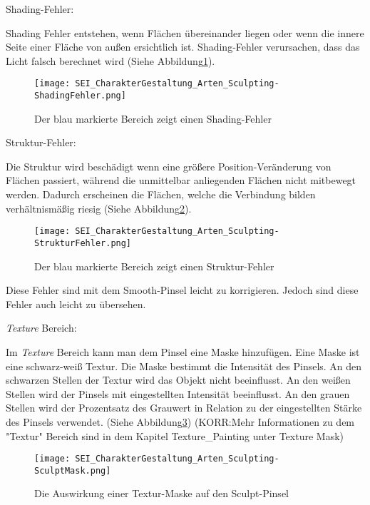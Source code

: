 Shading-Fehler:

Shading Fehler entstehen, wenn Flächen übereinander liegen oder wenn
die innere Seite einer Fläche von außen ersichtlich ist. Shading-Fehler
verursachen, dass das Licht falsch berechnet wird (Siehe Abbildung\ref{picture:shading_fehler}).

\begin{figure}[H]
    \centering
    \texttt{[image: SEI\_CharakterGestaltung\_Arten\_Sculpting-ShadingFehler.png]}
    \caption{Der blau markierte Bereich zeigt einen Shading-Fehler}
    \label{picture:shading_fehler}
\end{figure}


Struktur-Fehler:

Die Struktur wird beschädigt wenn eine größere Position-Veränderung von Flächen passiert, während die unmittelbar
anliegenden Flächen nicht mitbewegt werden. Dadurch erscheinen die Flächen, welche die Verbindung bilden
verhältnismäßig riesig (Siehe Abbildung\ref{picture:struktur_fehler}).

\begin{figure}[H]
    \centering
    \texttt{[image: SEI\_CharakterGestaltung\_Arten\_Sculpting-StrukturFehler.png]}
    \caption{Der blau markierte Bereich zeigt einen Struktur-Fehler}
    \label{picture:struktur_fehler}
\end{figure}



Diese Fehler sind mit dem Smooth-Pinsel leicht zu korrigieren.
Jedoch sind diese Fehler auch leicht zu übersehen.


\textit{Texture} Bereich\citep{blender:tex_mask}:

Im \textit{Texture} Bereich kann man dem Pinsel eine Maske hinzufügen. Eine Maske ist eine schwarz-weiß Textur.
Die Maske bestimmt die Intensität des Pinsels. An den schwarzen Stellen der Textur wird das Objekt nicht
beeinflusst. An den weißen Stellen wird der Pinsels mit eingestellten Intensität beeinflusst.
An den grauen Stellen wird der Prozentsatz des Grauwert in Relation zu der eingestellten
Stärke des Pinsels verwendet. (Siehe Abbildung\ref{picture:sculpt_tex_mask})
(KORR:Mehr Informationen zu dem "Textur" Bereich sind in dem Kapitel Texture_Painting unter Texture Mask)

\begin{figure}[H]
    \centering
    \texttt{[image: SEI\_CharakterGestaltung\_Arten\_Sculpting-SculptMask.png]}
    \caption{Die Auswirkung einer Textur-Maske auf den Sculpt-Pinsel}
    \label{picture:sculpt_tex_mask}
\end{figure}

